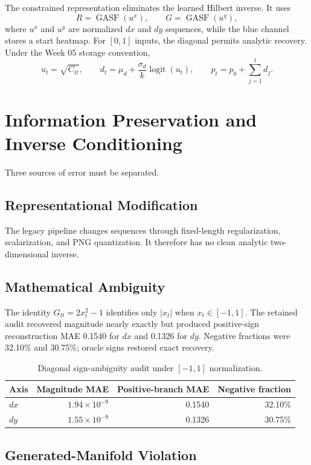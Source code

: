 \documentclass[12pt,a4paper,oneside]{report}
\begin{document}
The constrained representation eliminates the learned Hilbert inverse. It uses
\[
R=\operatorname{GASF}(u^x),\qquad
G=\operatorname{GASF}(u^y),
\]
where $u^x$ and $u^y$ are normalized $dx$ and $dy$ sequences, while the blue channel stores a start heatmap. For $[0,1]$ inputs, the diagonal permits analytic recovery. Under the Week 05 storage convention,
\[
u_t=\sqrt{C_{tt}},\qquad
d_t=\mu_d+\frac{\sigma_d}{k}\operatorname{logit}(u_t),\qquad
p_t=p_0+\sum_{j=1}^{t}d_j.
\]

\section{Information Preservation and Inverse Conditioning}

Three sources of error must be separated.

\subsection{Representational Modification}

The legacy pipeline changes sequences through fixed-length regularization, scalarization, and PNG quantization. It therefore has no clean analytic two-dimensional inverse.

\subsection{Mathematical Ambiguity}

The identity $G_{tt}=2x_t^2-1$ identifies only $|x_t|$ when $x_t\in[-1,1]$. The retained audit recovered magnitude nearly exactly but produced positive-sign reconstruction MAE 0.1540 for $dx$ and 0.1326 for $dy$. Negative fractions were 32.10\% and 30.75\%; oracle signs restored exact recovery.

\begin{table}[htbp]
\centering
\caption{Diagonal sign-ambiguity audit under $[-1,1]$ normalization.}
\label{tab:sign-ambiguity}
\begin{tabular}{lrrr}
\toprule
Axis & Magnitude MAE & Positive-branch MAE & Negative fraction \\
\midrule
$dx$ & $1.94\times10^{-9}$ & 0.1540 & 32.10\% \\
$dy$ & $1.55\times10^{-9}$ & 0.1326 & 30.75\% \\
\bottomrule
\end{tabular}
\end{table}

\subsection{Generated-Manifold Violation}
\end{document}
